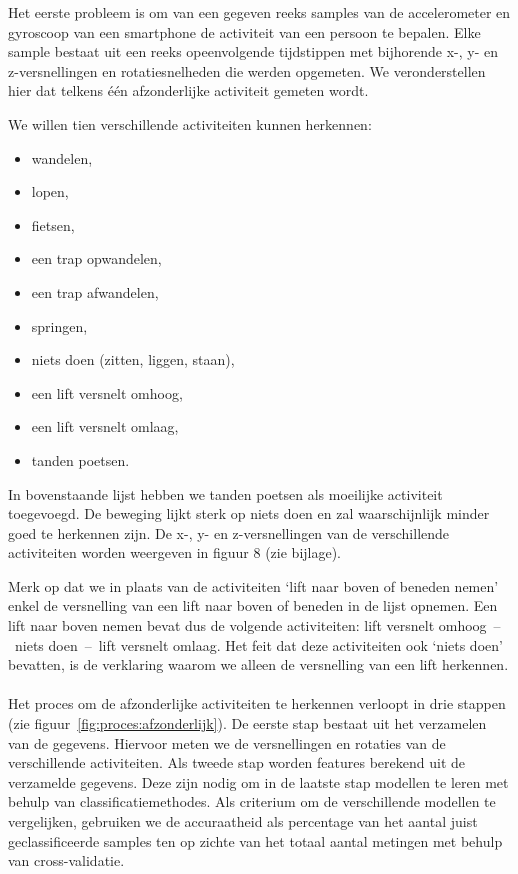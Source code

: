 \documentclass{article}
\begin{document}
Het eerste probleem is om van een gegeven reeks samples van de accelerometer en gyroscoop van een smartphone de activiteit van een persoon te bepalen. Elke sample bestaat uit een reeks opeenvolgende tijdstippen met bijhorende x-, y- en z-versnellingen en rotatiesnelheden die werden opgemeten. We veronderstellen hier dat telkens \'e\'en afzonderlijke activiteit gemeten wordt.

We willen tien verschillende activiteiten kunnen herkennen:
\begin{itemize}
\item wandelen,
\item lopen,
\item fietsen,
\item een trap opwandelen,
\item een trap afwandelen,
\item springen,
\item niets doen (zitten, liggen, staan),
\item een lift versnelt omhoog,
\item een lift versnelt omlaag,
\item tanden poetsen.
\end{itemize}

In bovenstaande lijst hebben we tanden poetsen als moeilijke activiteit toegevoegd. De beweging lijkt sterk op niets doen en zal waarschijnlijk minder goed te herkennen zijn. De x-, y- en z-versnellingen van de verschillende activiteiten worden weergeven in figuur 8 (zie bijlage).

Merk op dat we in plaats van de activiteiten `lift naar boven of beneden nemen' enkel de versnelling van een lift naar boven of beneden in de lijst opnemen. Een lift naar boven nemen bevat dus de volgende activiteiten: lift versnelt omhoog~--~niets doen~--~lift versnelt omlaag. Het feit dat deze activiteiten ook `niets doen' bevatten, is de verklaring waarom we alleen de versnelling van een lift herkennen.
\\~\\
Het proces om de afzonderlijke activiteiten te herkennen verloopt in drie stappen (zie figuur~\ref{fig:proces:afzonderlijk}). De eerste stap bestaat uit het verzamelen van de gegevens. Hiervoor meten we de versnellingen en rotaties van de verschillende activiteiten. Als tweede stap worden features berekend uit de verzamelde gegevens. Deze zijn nodig om in de laatste stap modellen te leren met behulp van classificatiemethodes. Als criterium om de verschillende modellen te vergelijken, gebruiken we de accuraatheid als percentage van het aantal juist geclassificeerde samples ten op zichte van het totaal aantal metingen met behulp van cross-validatie.
\end{document}
